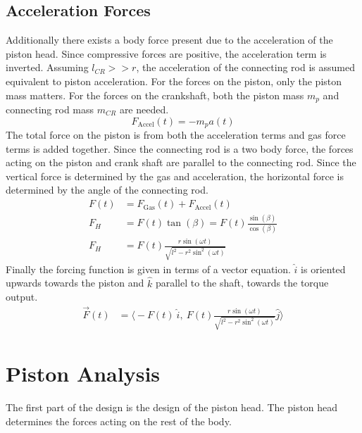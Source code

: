 \documentclass[10pt,a4paper]{article}
\begin{document}
\subsection*{Acceleration Forces}
Additionally there exists a body force present due to the acceleration of the piston head. Since compressive forces are positive, the acceleration term is inverted. Assuming $l_{CR} >> r$, the acceleration of the connecting rod is assumed equivalent to piston acceleration. For the forces on the piston, only the piston mass matters. For the forces on the crankshaft, both the piston mass $m_p$ and connecting rod mass $m_{CR}$ are needed.
$$F_{\text{Accel}}(t) = - m_p a(t)$$
The total force on the piston is from both the acceleration terms and gas force terms is added together.
Since the connecting rod is a two body force, the forces acting on the piston and crank shaft are parallel to the connecting rod. Since the vertical force is determined by the gas and acceleration, the horizontal force is determined by the angle of the connecting rod. 
\begin{align}
	F(t) &= F_{\text{Gas}}(t)+	F_{\text{Accel}}(t)\\
	F_H &= F(t) \tan( \beta) = F(t) \frac{\sin (\beta)}{\cos (\beta)}\\
	F_H &= F(t) \frac{r \sin (\omega t)}{\sqrt{l^2 - r^2 \sin^2(\omega t)}}
\end{align}
Finally the forcing function is given in terms of a vector equation. $\hat{i}$ is oriented upwards towards the piston and $\hat{k}$ parallel to the shaft, towards the torque output.  
\begin{align}
\vec{F}(t) &= \big \langle -F(t)\ \hat{i},\ F(t) \frac{r \sin(\omega t)}{\sqrt{l^2 - r^2 \sin^2(\omega t)}}  \hat{j} \big \rangle
\end{align}

\newpage
\section*{Piston Analysis}
The first part of the design is the design of the piston head. The piston head determines the forces acting on the rest of the body.
\end{document}

